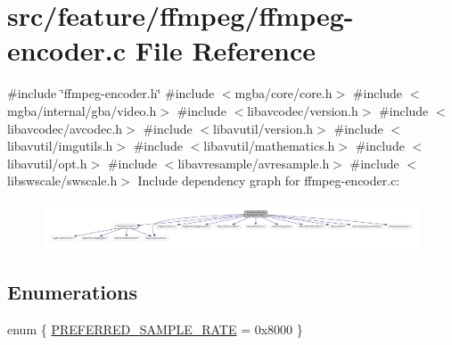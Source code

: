 \hypertarget{ffmpeg-encoder_8c}{}\section{src/feature/ffmpeg/ffmpeg-\/encoder.c File Reference}
\label{ffmpeg-encoder_8c}
{\ttfamily \#include \char`\"{}ffmpeg-\/encoder.\+h\char`\"{}}\newline
{\ttfamily \#include $<$mgba/core/core.\+h$>$}\newline
{\ttfamily \#include $<$mgba/internal/gba/video.\+h$>$}\newline
{\ttfamily \#include $<$libavcodec/version.\+h$>$}\newline
{\ttfamily \#include $<$libavcodec/avcodec.\+h$>$}\newline
{\ttfamily \#include $<$libavutil/version.\+h$>$}\newline
{\ttfamily \#include $<$libavutil/imgutils.\+h$>$}\newline
{\ttfamily \#include $<$libavutil/mathematics.\+h$>$}\newline
{\ttfamily \#include $<$libavutil/opt.\+h$>$}\newline
{\ttfamily \#include $<$libavresample/avresample.\+h$>$}\newline
{\ttfamily \#include $<$libswscale/swscale.\+h$>$}\newline
Include dependency graph for ffmpeg-\/encoder.c\+:
\nopagebreak
\begin{figure}[H]
\begin{center}
\leavevmode
\includegraphics[width=350pt]{ffmpeg-encoder_8c__incl}
\end{center}
\end{figure}
\subsection*{Enumerations}
\begin{DoxyCompactItemize}
\item 
enum \{ \mbox{\hyperlink{ffmpeg-encoder_8c_adf764cbdea00d65edcd07bb9953ad2b7a2656e6725d5bdaffeeb5d585d0b1d892}{P\+R\+E\+F\+E\+R\+R\+E\+D\+\_\+\+S\+A\+M\+P\+L\+E\+\_\+\+R\+A\+TE}} = 0x8000
 \}
\end{DoxyCompactItemize}
